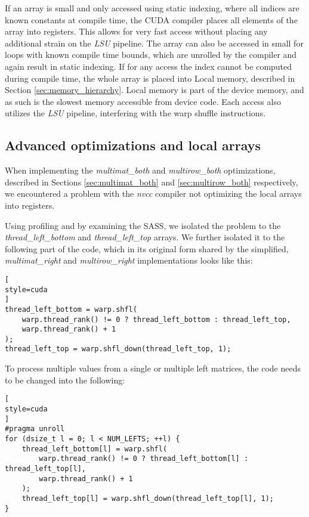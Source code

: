 If an array is small and only accessed using static indexing, where all indices are known constants at compile time, the CUDA compiler places all elements of the array into registers.  %
This allows for very fast access without placing any additional strain on the \textit{LSU} pipeline. The array can also be accessed in small for loops with known compile time bounds, which are unrolled by the compiler and again result in static indexing. If for any access the index cannot be computed during compile time, the whole array is placed into Local memory, described in Section \ref{sec:memory_hierarchy}. Local memory is part of the device memory, and as such is the slowest memory accessible from device code. Each access also utilizes the \textit{LSU} pipeline, interfering with the warp shuffle instructions. 



\subsection{Advanced optimizations and local arrays}
\label{sec:local_array_optimization_code_changes}

When implementing the \textit{multimat\_both} and \textit{multirow\_both} optimizations, described in Sections \ref{sec:multimat_both} and \ref{sec:multirow_both} respectively, we encountered a problem with the \textit{nvcc} compiler not optimizing the local arrays into registers. 

Using profiling and by examining the SASS, we isolated the problem to the \textit{thread\_left\_bottom} and \textit{thread\_left\_top} arrays. We further isolated it to the following part of the code, which in its original form shared by the simplified, \textit{multimat\_right} and \textit{multirow\_right} implementations looks like this:

\begin{lstlisting}[
style=cuda
]
thread_left_bottom = warp.shfl(
	warp.thread_rank() != 0 ? thread_left_bottom : thread_left_top,
	warp.thread_rank() + 1
);
thread_left_top = warp.shfl_down(thread_left_top, 1);
\end{lstlisting}

To process multiple values from a single or multiple left matrices, the code needs to be changed into the following:

\begin{lstlisting}[
style=cuda
]
#pragma unroll
for (dsize_t l = 0; l < NUM_LEFTS; ++l) {
	thread_left_bottom[l] = warp.shfl(
		warp.thread_rank() != 0 ? thread_left_bottom[l] : thread_left_top[l],
		warp.thread_rank() + 1
	);
	thread_left_top[l] = warp.shfl_down(thread_left_top[l], 1);
}
\end{lstlisting}

